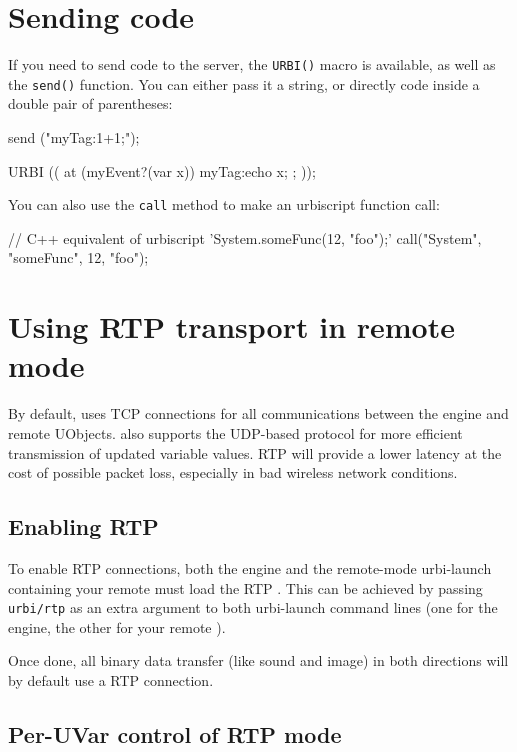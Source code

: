\section{Sending \us code}

If you need to send \us code to the server, the \lstinline{URBI()}
macro is available, as well as the \lstinline{send()} function. You
can either pass it a string, or directly \urbi code inside a double
pair of parentheses:

\begin{urbiunchecked}
send ("myTag:1+1;");

URBI (( at (myEvent?(var x)) { myTag:echo x; }; ));
\end{urbiunchecked}

You can also use the \lstinline{call} method to make an urbiscript function
call:

\begin{urbiunchecked}
// C++ equivalent of urbiscript 'System.someFunc(12, "foo");'
call("System", "someFunc", 12, "foo");
\end{urbiunchecked}

\section{Using RTP transport in remote mode}
\label{sec:uob:api:rtp}

By default, \urbi uses TCP connections for all communications between the
engine and remote UObjects. \urbi also supports the UDP-based 
protocol for more efficient transmission of updated variable values. RTP
will provide a lower latency at the cost of possible packet loss, especially
in bad wireless network conditions.

\subsection{Enabling RTP}

To enable RTP connections, both the engine and the remote-mode urbi-launch
containing your remote \UObject must load the RTP \UObject. This can be
achieved by passing \lstinline|urbi/rtp| as an extra argument to both
urbi-launch command lines (one for the engine, the other for your remote
\UObject).

Once done, all binary data transfer (like sound and image) in both
directions will by default use a RTP connection.

\subsection{Per-UVar control of RTP mode}

